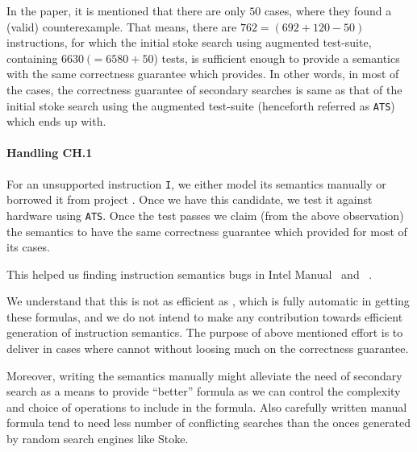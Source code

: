    In the paper\cite{Heule2016a}, it is mentioned that there are only $50$
   cases, where they found a (valid) counterexample. That means, there are $762
   = (692 + 120 - 50)$ instructions, for which  the initial stoke search using
   augmented test-suite, containing $6630\ (= 6580 + 50$) tests,  is sufficient
   enough to provide a semantics with the same correctness guarantee which
   \Strata provides.   In other words, in  most of the cases, the correctness
   guarantee of secondary searches is same as that of the initial stoke search
   using the augmented test-suite (henceforth referred as {\tt ATS})  which
   \Strata ends up with. 
      
      
    \paragraph{Handling CH.1} For an unsupported instruction {\tt I}, we either
    model its semantics  manually or borrowed it from project \Stoke.   Once we
    have this candidate, we test it against hardware using {\tt ATS}.  Once the
    test passes we claim (from the above observation) the semantics to have the
    same correctness guarantee which \Strata provided for most of its cases.
    
    This helped us finding instruction semantics bugs in Intel
    Manual~\cite{BugIntel} and \Stoke~\cite{BugStoke983}.
    
    We understand that this is not as efficient as \Stoke, which is fully
    automatic in getting these formulas, and we do not intend to make any
    contribution towards efficient generation of instruction semantics. The
    purpose of above mentioned effort is to deliver in cases where \Stoke cannot
    without loosing much on the correctness guarantee. 
   
   Moreover, writing the semantics manually might alleviate the need of
   secondary search as a means to provide ``better'' formula as we can control
   the complexity and choice of operations to include in the formula. Also
   carefully written manual formula tend to need less number of conflicting
   searches than the onces generated by random search engines like Stoke.
   
